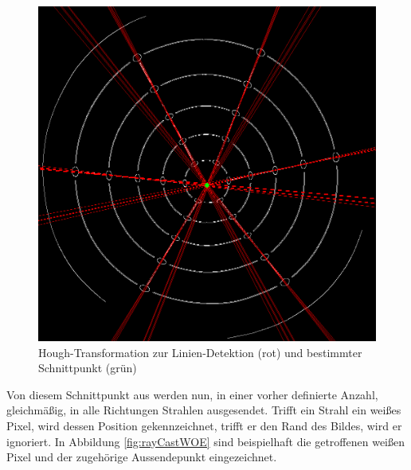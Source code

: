 \begin{figure}[!htb]
	\centering
	\includegraphics[scale=.25]{images/houghLines.png}
	\caption{Hough-Transformation zur Linien-Detektion (rot) und bestimmter Schnittpunkt (grün) }
	\label{fig:houghLines}
\end{figure}

Von diesem Schnittpunkt aus werden nun, in einer vorher definierte Anzahl, gleichmäßig, in alle Richtungen Strahlen ausgesendet.
Trifft ein Strahl ein weißes Pixel, wird dessen Position gekennzeichnet, trifft er den Rand des Bildes, wird er ignoriert. In Abbildung \ref{fig:rayCastWOE} sind beispielhaft die getroffenen weißen Pixel und der zugehörige Aussendepunkt eingezeichnet.

